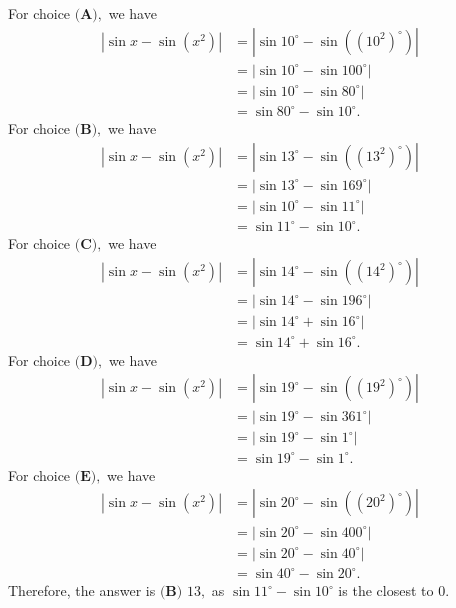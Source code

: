 \begin{enumerate}
For choice $\textbf{(A)},$ we have
 \begin{align*} \left| \sin x - \sin \left( x^2 \right) \right| & = \left| \sin 10^\circ - \sin \left( \left( 10^2 \right)^\circ \right) \right| \\ & = \left| \sin 10^\circ - \sin 100^\circ \right| \\ & = \left| \sin 10^\circ - \sin 80^\circ \right| \\ & = \sin 80^\circ - \sin 10^\circ . \end{align*}
For choice $\textbf{(B)},$ we have
 \begin{align*} \left| \sin x - \sin \left( x^2 \right) \right| & = \left| \sin 13^\circ - \sin \left( \left( 13^2 \right)^\circ \right) \right| \\ & = \left| \sin 13^\circ - \sin 169^\circ \right| \\ & = \left| \sin 10^\circ - \sin 11^\circ \right| \\ & = \sin 11^\circ - \sin 10^\circ . \end{align*}
For choice $\textbf{(C)},$ we have
 \begin{align*} \left| \sin x - \sin \left( x^2 \right) \right| & = \left| \sin 14^\circ - \sin \left( \left( 14^2 \right)^\circ \right) \right| \\ & = \left| \sin 14^\circ - \sin 196^\circ \right| \\ & = \left| \sin 14^\circ + \sin 16^\circ \right| \\ & = \sin 14^\circ + \sin 16^\circ . \end{align*}
For choice $\textbf{(D)},$ we have
 \begin{align*} \left| \sin x - \sin \left( x^2 \right) \right| & = \left| \sin 19^\circ - \sin \left( \left( 19^2 \right)^\circ \right) \right| \\ & = \left| \sin 19^\circ - \sin 361^\circ \right| \\ & = \left| \sin 19^\circ - \sin 1^\circ \right| \\ & = \sin 19^\circ - \sin 1^\circ . \end{align*}
For choice $\textbf{(E)},$ we have
 \begin{align*} \left| \sin x - \sin \left( x^2 \right) \right| & = \left| \sin 20^\circ - \sin \left( \left( 20^2 \right)^\circ \right) \right| \\ & = \left| \sin 20^\circ - \sin 400^\circ \right| \\ & = \left| \sin 20^\circ - \sin 40^\circ \right| \\ & = \sin 40^\circ - \sin 20^\circ . \end{align*}
Therefore, the answer is $\boxed{\textbf{(B) }13},$ as $\sin 11^\circ - \sin 10^\circ$ is the closest to $0.$


\end{enumerate}
